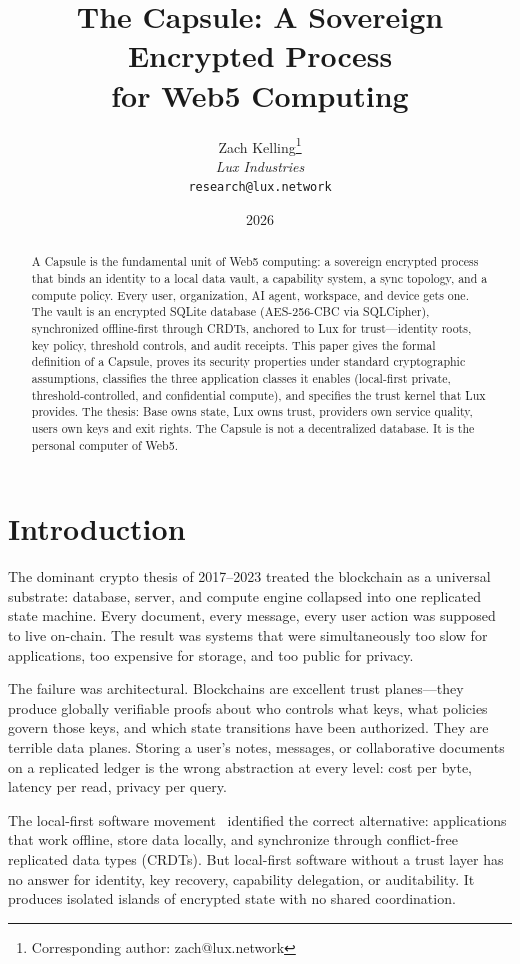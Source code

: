 \documentclass[11pt,a4paper]{article}
\title{\textbf{The Capsule: A Sovereign Encrypted Process\\for Web5 Computing}}
\author{
Zach Kelling\thanks{Corresponding author: zach@lux.network}\\
\textit{Lux Industries}\\
\texttt{research@lux.network}
}
\date{2026}
\begin{document}
\luxcoverpage

\begin{abstract}
A Capsule is the fundamental unit of Web5 computing: a sovereign encrypted process
that binds an identity to a local data vault, a capability system, a sync topology,
and a compute policy. Every user, organization, AI agent, workspace, and device
gets one. The vault is an encrypted SQLite database (AES-256-CBC via SQLCipher),
synchronized offline-first through CRDTs, anchored to Lux for trust---identity
roots, key policy, threshold controls, and audit receipts. This paper gives the
formal definition of a Capsule, proves its security properties under standard
cryptographic assumptions, classifies the three application classes it enables
(local-first private, threshold-controlled, and confidential compute), and
specifies the trust kernel that Lux provides. The thesis: Base owns state, Lux
owns trust, providers own service quality, users own keys and exit rights. The
Capsule is not a decentralized database. It is the personal computer of Web5.
\end{abstract}

\section{Introduction}\label{sec:intro}

The dominant crypto thesis of 2017--2023 treated the blockchain as a universal
substrate: database, server, and compute engine collapsed into one replicated
state machine. Every document, every message, every user action was supposed to
live on-chain. The result was systems that were simultaneously too slow for
applications, too expensive for storage, and too public for privacy.

The failure was architectural. Blockchains are excellent trust planes---they
produce globally verifiable proofs about who controls what keys, what policies
govern those keys, and which state transitions have been authorized. They are
terrible data planes. Storing a user's notes, messages, or collaborative documents
on a replicated ledger is the wrong abstraction at every level: cost per byte,
latency per read, privacy per query.

The local-first software movement~\cite{kleppmann2019} identified the correct
alternative: applications that work offline, store data locally, and synchronize
through conflict-free replicated data types (CRDTs). But local-first software
without a trust layer has no answer for identity, key recovery, capability
delegation, or auditability. It produces isolated islands of encrypted state
with no shared coordination.
\end{document}
